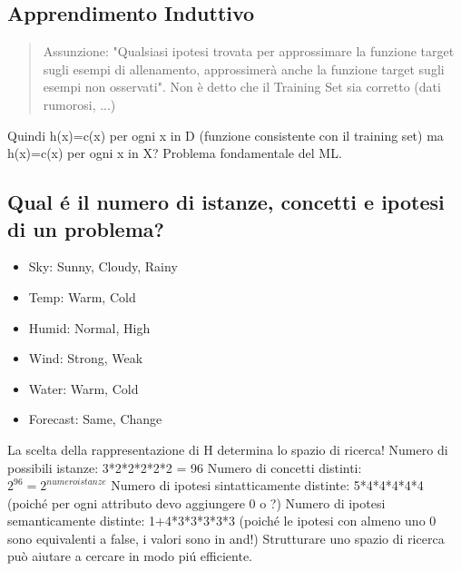 \documentclass{article}
\begin{document}
\subsection{Apprendimento Induttivo}
\begin{quote}
    Assunzione: "Qualsiasi ipotesi trovata per approssimare la funzione target sugli esempi di allenamento, approssimerà anche la funzione target sugli esempi non osservati". Non è detto che il Training Set sia corretto (dati rumorosi, ...)
\end{quote}
Quindi h(x)=c(x) per ogni x in D (funzione consistente con il training set) ma h(x)=c(x) per ogni x in X? Problema fondamentale del ML.

\subsection{Qual é il numero di istanze, concetti e ipotesi di un problema?}
\begin{itemize}
    \item Sky: Sunny, Cloudy, Rainy
    \item Temp: Warm, Cold
    \item Humid: Normal, High
    \item Wind: Strong, Weak
    \item Water: Warm, Cold
    \item Forecast: Same, Change
\end{itemize}
La scelta della rappresentazione di H determina lo spazio di ricerca! \newline
Numero di possibili istanze: 3*2*2*2*2*2 = 96 \newline
Numero di concetti distinti: $2^96 = 2^{numeroistanze}$ \newline
Numero di ipotesi sintatticamente distinte: 5*4*4*4*4*4 (poiché per ogni attributo devo aggiungere 0 o ?) \newline
Numero di ipotesi semanticamente distinte: 1+4*3*3*3*3*3 (poiché le ipotesi con almeno uno 0 sono equivalenti a false, i valori sono in and!) \newline
Strutturare uno spazio di ricerca può aiutare a cercare in modo piú efficiente.
\end{document}
